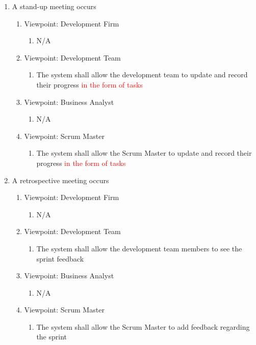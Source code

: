 \documentclass[12pt, titlepage]{article}
\begin{document}
\begin{enumerate}[{BE}1.]
	\item A stand-up meeting occurs     %
	\begin{enumerate}[{VP}1.] 
	    \item Viewpoint: Development Firm
	        \begin{enumerate}
	            \item[] N/A
	        \end{enumerate}
	    \item Viewpoint: Development Team
	        \begin{enumerate}
	            \item The system shall allow the development team to update and record their progress \textcolor{red}{in the form of tasks}
	        \end{enumerate}
		\item Viewpoint: Business Analyst
			\begin{enumerate}
			    \item[] N/A
			\end{enumerate}
		\item Viewpoint: Scrum Master
			\begin{enumerate}
			    \item The system shall allow the Scrum Master to update and record their progress \textcolor{red}{in the form of tasks}
			\end{enumerate}
	\end{enumerate}

    \item A retrospective meeting occurs     %
	\begin{enumerate}[{VP}1.] 
	    \item Viewpoint: Development Firm
	        \begin{enumerate}
	            \item[] N/A
	        \end{enumerate}
	    \item Viewpoint: Development Team
	        \begin{enumerate}
	            \item The system shall allow the development team members to see the sprint feedback
	        \end{enumerate}
		\item Viewpoint: Business Analyst
			\begin{enumerate}
			    \item[] N/A
			\end{enumerate}
		\item Viewpoint: Scrum Master
			\begin{enumerate}
			    \item The system shall allow the Scrum Master to add feedback regarding the sprint
			\end{enumerate}
	\end{enumerate}
	

\end{enumerate}
\end{document}
